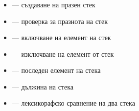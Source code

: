 \documentclass[alsotrans]{beamerswitch}
\begin{document}
\begin{frame}
  \frametitle{}

  \begin{itemize}
  \item {} --- създаване на празен стек
  \item {} --- проверка за празнота на стек
  \item {} --- включване на елемент на стек
  \item {} --- изключване на елемент от стек
  \item {} --- последен елемент на стека
  \item {} --- дължина на стека
  \item \lst{==,!=,<,>,<=,>=} --- лексикорафско сравнение на два стека
  \end{itemize}
\end{frame}
\end{document}
